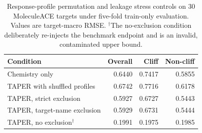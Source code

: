 \begin{table}[t]
\centering
\caption{Response-profile permutation and leakage stress controls on 30 MoleculeACE targets under five-fold train-only evaluation. Values are target-macro RMSE. $^{\dagger}$The no-exclusion condition deliberately re-injects the benchmark endpoint and is an invalid, contaminated upper bound.}
\label{tab:profile-controls}
\footnotesize
\begin{tabular}{lrrr}
\toprule
Condition & Overall & Cliff & Non-cliff\\
\midrule
Chemistry only & 0.6440 & 0.7417 & 0.5855\\
TAPER with shuffled profiles & 0.6742 & 0.7716 & 0.6178\\
TAPER, strict exclusion & 0.5927 & 0.6727 & 0.5443\\
TAPER, target-name exclusion & 0.5929 & 0.6731 & 0.5444\\
TAPER, no exclusion$^{\dagger}$ & 0.1991 & 0.1975 & 0.1985\\
\bottomrule
\end{tabular}
\end{table}

